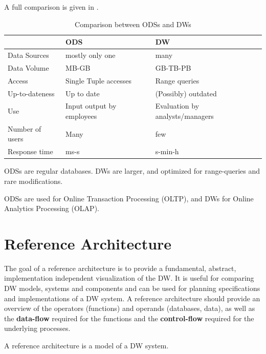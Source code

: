 \documentclass{article}
\begin{document}
A full comparison is given in .

\begin{table}[ht]
    \center
    \begin{tabular}{| l | l | l |}
        \hline
        & ODS & DW\\
        \hline
        Data Sources & mostly only one & many\\
        Data Volume & MB-GB & GB-TB-PB\\
        Access & Single Tuple accesses & Range queries\\
        Up-to-dateness & Up to date & (Possibly) outdated\\
        Use & Input output by employees & Evaluation by analysts/managers\\
        Number of users & Many & few\\
        Response time & ms-s & s-min-h\\
        \hline
    \end{tabular}
    \caption{Comparison between ODSs and DWs}
    \label{tbl:odsDwComp}
\end{table}

\begin{keypointbox}
    ODSs are regular databases.
    DWs are larger, and optimized for range-queries and rare modifications.
\end{keypointbox}

\begin{keypointbox}
    ODSs are used for Online Transaction Processing (OLTP), and DWs for Online Analytics Processing (OLAP).
\end{keypointbox}

\section{Reference Architecture}
\label{architecture}
The goal of a reference architecture is to provide a fundamental, abstract, implementation independent visualization of the DW.
It is useful for comparing DW models, systems and components and can be used for planning specifications and implementations of a DW system.
A reference architecture should provide an overview of the operators (functions) and operands (databases, data), as well as the \textbf{data-flow} required for the functions and the \textbf{control-flow} required for the underlying processes.

\begin{keypointbox}
    A reference architecture is a model of a DW system.
\end{keypointbox}
\end{document}
